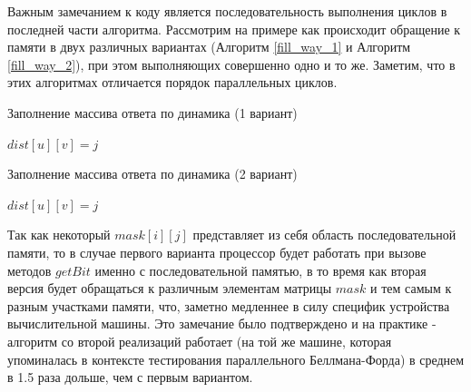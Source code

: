 Важным замечанием к коду является последовательность выполнения циклов в последней части алгоритма. Рассмотрим на примере как происходит обращение к памяти в двух различных вариантах (Алгоритм \ref{fill_way_1} и Алгоритм \ref{fill_way_2}), при этом выполняющих совершенно одно и то же. Заметим, что в этих алгоритмах отличается порядок параллельных циклов. 

\FloatBarrier
\begin{algorithm}
\caption{Заполнение массива ответа по динамика (1 вариант)}\label{fill_way_1}
\begin{algorithmic}[1]

\algrenewcommand{}
\algrenewcommand{}
		\algrenewcommand{}	
				\State $dist[u][v] = j$		
			\EndIf	
		\EndFor
		\algrenewcommand{}
	\EndFor
\EndFor 
\EndProcedure
\end{algorithmic}
\end{algorithm}

\FloatBarrier
\begin{algorithm}
\caption{Заполнение массива ответа по динамика (2 вариант)}\label{fill_way_2}
\begin{algorithmic}[1]

\algrenewcommand{}
\algrenewcommand{}
		\algrenewcommand{}	
				\State $dist[u][v] = j$		
			\EndIf	
		\EndFor
		\algrenewcommand{}
	\EndFor
\EndFor 
\EndProcedure
\end{algorithmic}
\end{algorithm}
\FloatBarrier

Так как некоторый $mask[i][j]$ представляет из себя область последовательной памяти, то в случае первого варианта процессор будет работать при вызове методов $getBit$ именно с последовательной памятью, в то время как вторая версия будет обращаться к различным элементам матрицы $mask$ и тем самым к разным участками памяти, что, заметно медленнее в силу специфик устройства вычислительной машины. Это замечание было подтверждено и на практике - алгоритм со второй реализаций работает (на той же машине, которая упоминалась в контексте тестирования параллельного Беллмана-Форда) в среднем в 1.5 раза дольше, чем с первым вариантом.

